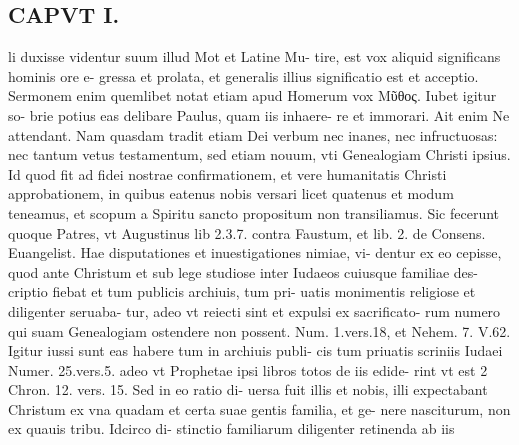 \documentclass{article}
\begin{document}
\begin{pages}
\section*{CAPVT  I. }
\marginpar{[ p.11 ]}\pstart li duxisse videntur suum illud Mot et Latine Mu- tire, est vox aliquid significans hominis ore e- gressa et prolata, et generalis illius significatio est et acceptio. Sermonem enim quemlibet notat etiam apud Homerum vox Μῦθος. Iubet igitur so- brie potius eas delibare Paulus, quam iis inhaere- re et immorari. Ait enim Ne attendant. Nam quasdam tradit etiam Dei verbum nec inanes, nec infructuosas: nec tantum vetus testamentum, sed etiam nouum, vti Genealogiam Christi ipsius. Id quod fit ad fidei nostrae confirmationem, et vere humanitatis Christi approbationem, in quibus eatenus nobis versari licet quatenus et modum teneamus, et scopum a Spiritu sancto propositum non transiliamus. Sic fecerunt quoque Patres, vt Augustinus lib 2.3.7. contra Faustum, et lib. 2. de Consens. Euangelist. Hae disputationes et inuestigationes nimiae, vi- dentur ex eo cepisse, quod ante Christum et sub lege studiose inter Iudaeos cuiusque familiae des- criptio fiebat et tum publicis archiuis, tum pri- uatis monimentis religiose et diligenter seruaba- tur, adeo vt reiecti sint et expulsi ex sacrificato- rum numero qui suam Genealogiam ostendere non possent. Num. 1.vers.18, et Nehem. 7. V.62. Igitur iussi sunt eas habere tum in archiuis publi- cis tum priuatis scriniis Iudaei Numer. 25.vers.5. adeo vt Prophetae ipsi libros totos de iis edide- rint vt est 2 Chron. 12. vers. 15. Sed in eo ratio di- uersa fuit illis et nobis, illi expectabant Christum ex vna quadam et certa suae gentis familia, et ge- nere nasciturum, non ex quauis tribu. Idcirco di- stinctio familiarum diligenter retinenda ab iis  \pend

\end{pages}
\end{document}
